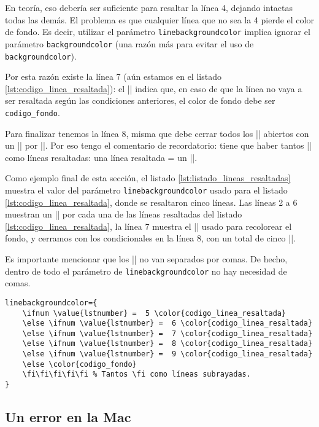 En teoría, eso debería ser suficiente para resaltar la línea 4, dejando intactas todas las demás. El problema es que cualquier línea que no sea la 4 pierde el color de fondo. Es decir, utilizar el parámetro \texttt{linebackgroundcolor} implica ignorar el parámetro \texttt{backgroundcolor} (una razón más para evitar el uso de \texttt{backgroundcolor}).

Por esta razón existe la línea 7 (aún estamos en el listado \ref{lst:codigo_linea_resaltada}): el |\else| indica que, en caso de que la línea no vaya a ser resaltada según las condiciones anteriores, el color de fondo debe ser \texttt{codigo\_fondo}.

Para finalizar tenemos la línea 8, misma que debe cerrar todos los |\ifnum| abiertos con un |\fi| por |\ifnum|. Por eso tengo el comentario de recordatorio: tiene que haber tantos |\fi| como líneas resaltadas: una línea resaltada = un |\fi|.

Como ejemplo final de esta sección, el listado \ref{lst:listado_lineas_resaltadas} muestra el valor del parámetro \texttt{linebackgroundcolor} usado para el listado \ref{lst:codigo_linea_resaltada}, donde se resaltaron cinco líneas. Las líneas 2 a 6 muestran un |\ifnum| por cada una de las líneas resaltadas del listado \ref{lst:codigo_linea_resaltada}, la línea 7 muestra el |\else| usado para recolorear el fondo, y cerramos con los condicionales en la línea 8, con un total de cinco |\fi|.

Es importante mencionar que los |\ifnum| no van separados por comas. De hecho, dentro de todo el parámetro de \texttt{linebackgroundcolor} no hay necesidad de comas.

\begin{lstlisting}[style=latex,label=lst:listado_lineas_resaltadas,caption={Parámetro \texttt{linebackgroundcolor} con varias líneas resaltadas.}]
linebackgroundcolor={
	\ifnum \value{lstnumber} =  5 \color{codigo_linea_resaltada}
	\else \ifnum \value{lstnumber} =  6 \color{codigo_linea_resaltada}
	\else \ifnum \value{lstnumber} =  7 \color{codigo_linea_resaltada}
	\else \ifnum \value{lstnumber} =  8 \color{codigo_linea_resaltada}
	\else \ifnum \value{lstnumber} =  9 \color{codigo_linea_resaltada}
	\else \color{codigo_fondo}
	\fi\fi\fi\fi\fi % Tantos \fi como líneas subrayadas.
}
\end{lstlisting}


\subsection{Un error en la Mac}
\label{sub:un_error_en_la_mac}



